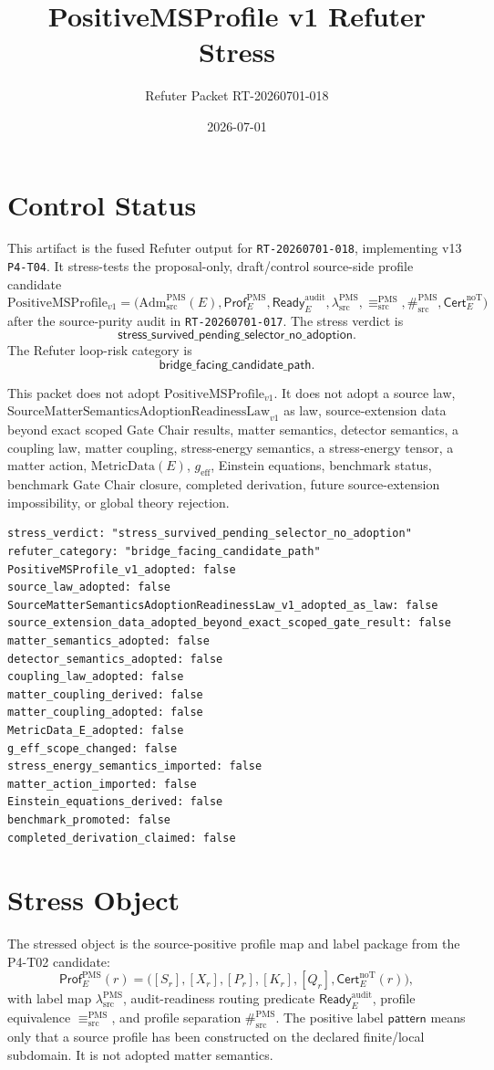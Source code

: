 \documentclass[11pt]{article}
\title{PositiveMSProfile v1 Refuter Stress}
\author{Refuter Packet RT-20260701-018}
\date{2026-07-01}
\newcommand{\SMSAR}{\mathrm{SourceMatterSemanticsAdoptionReadinessLaw}_{v1}}
\newcommand{\PMSProf}{\mathrm{PositiveMSProfile}_{v1}}
\newcommand{\AdmPMS}{\mathrm{Adm}^{\mathrm{PMS}}_{\mathrm{src}}}
\newcommand{\Prof}{\mathsf{Prof}^{\mathrm{PMS}}_E}
\newcommand{\Ready}{\mathsf{Ready}^{\mathrm{audit}}_E}
\newcommand{\Cert}{\mathsf{Cert}^{\mathrm{noT}}_E}
\newcommand{\lambdaProf}{\lambda^{\mathrm{PMS}}_{\mathrm{src}}}
\newcommand{\EqProf}{\equiv^{\mathrm{PMS}}_{\mathrm{src}}}
\newcommand{\SepProf}{\#^{\mathrm{PMS}}_{\mathrm{src}}}
\newcommand{\Pattern}{\mathsf{pattern}}
\newcommand{\MetricData}{\mathrm{MetricData}}
\newcommand{\geff}{g_{\mathrm{eff}}}
\newcommand{\StressVerdict}{\mathsf{stress\_survived\_pending\_selector\_no\_adoption}}
\begin{document}
\maketitle

\section{Control Status}

This artifact is the fused Refuter output for \texttt{RT-20260701-018},
implementing v13 \texttt{P4-T04}. It stress-tests the proposal-only,
draft/control source-side profile candidate
\[
  \PMSProf =
  \bigl(\AdmPMS(E),\Prof,\Ready,\lambdaProf,\EqProf,\SepProf,\Cert\bigr)
\]
after the source-purity audit in \texttt{RT-20260701-017}. The stress verdict
is
\[
  \StressVerdict.
\]
The Refuter loop-risk category is
\[
  \mathsf{bridge\_facing\_candidate\_path}.
\]

This packet does not adopt \(\PMSProf\). It does not adopt a source law,
\(\SMSAR\) as law, source-extension data beyond exact scoped Gate Chair
results, matter semantics, detector semantics, a coupling law, matter
coupling, stress-energy semantics, a stress-energy tensor, a matter action,
\(\MetricData(E)\), \(\geff\), Einstein equations, benchmark status,
benchmark Gate Chair closure, completed derivation, future source-extension
impossibility, or global theory rejection.

\begin{verbatim}
stress_verdict: "stress_survived_pending_selector_no_adoption"
refuter_category: "bridge_facing_candidate_path"
PositiveMSProfile_v1_adopted: false
source_law_adopted: false
SourceMatterSemanticsAdoptionReadinessLaw_v1_adopted_as_law: false
source_extension_data_adopted_beyond_exact_scoped_gate_result: false
matter_semantics_adopted: false
detector_semantics_adopted: false
coupling_law_adopted: false
matter_coupling_derived: false
matter_coupling_adopted: false
MetricData_E_adopted: false
g_eff_scope_changed: false
stress_energy_semantics_imported: false
matter_action_imported: false
Einstein_equations_derived: false
benchmark_promoted: false
completed_derivation_claimed: false
\end{verbatim}

\section{Stress Object}

The stressed object is the source-positive profile map and label package from
the P4-T02 candidate:
\[
  \Prof(r)=
  \bigl([S_r],[X_r],[P_r],[K_r],[Q_r],\Cert(r)\bigr),
\]
with label map \(\lambdaProf\), audit-readiness routing predicate \(\Ready\),
profile equivalence \(\EqProf\), and profile separation \(\SepProf\). The
positive label \(\Pattern\) means only that a source profile has been
constructed on the declared finite/local subdomain. It is not adopted matter
semantics.
\end{document}
